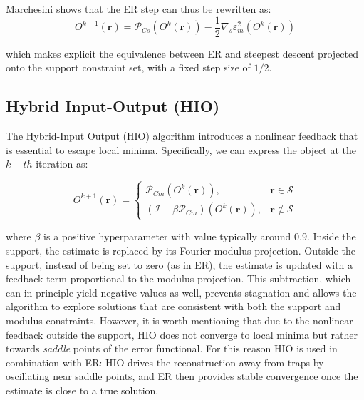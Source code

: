 Marchesini shows that the ER step can thus be rewritten as:
\begin{equation}
    O^{k+1}(\mathbf{r}) = \mathcal{P}_{Cs}(O^{k}(\mathbf{r})) - \frac{1}{2}\nabla_s \varepsilon^{2}_m(O^{k}(\mathbf{r}))
    \label{eq:ER_gradient}
\end{equation}

which makes explicit the equivalence between ER and steepest descent projected onto the support constraint set, with 
a fixed step size of $1/2$.

\subsection{Hybrid Input-Output (HIO)}
The Hybrid-Input Output (HIO) algorithm introduces a nonlinear feedback that is essential to escape local minima. 
Specifically, we can express the object at the $k-th$ iteration as: 

\begin{equation}
    O^{k+1}(\mathbf{r}) = 
    \begin{cases}
        \mathcal{P}_{Cm}(O^{k}(\mathbf{r})), &   \mathbf{r} \in \mathcal{S} \\
        (\mathcal{I} -\beta\mathcal{P}_{Cm})(O^{k}(\mathbf{r})),  & \mathbf{r} \notin \mathcal{S}
     \end{cases}
     \label{eq:HIO}
\end{equation}

where $\beta$ is a positive hyperparameter with value typically around $0.9$.
Inside the support, the estimate is replaced by its Fourier-modulus projection. Outside the support, instead of being 
set to zero (as in ER), the estimate is updated with a feedback term proportional to the modulus projection. 
This subtraction, which can in principle yield negative values as well, prevents stagnation and allows the algorithm 
to explore solutions that are consistent with both the support and modulus constraints.
However, it is worth mentioning that due to the nonlinear feedback outside the support, HIO does not converge to local 
minima but rather towards \textit{saddle} points of the error functional. For this reason HIO is used in
combination with ER: HIO drives the reconstruction away from traps by oscillating near saddle points, and ER then 
provides stable convergence once the estimate is close to a true solution. 

